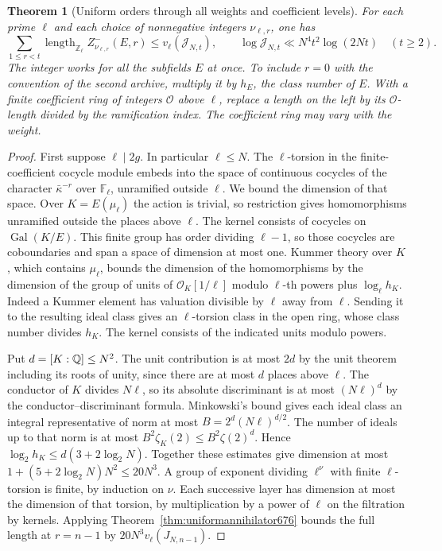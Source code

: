 \documentclass[a4paper,11pt]{article}
\newtheorem{theorem}[proposition]{Theorem}
\theoremstyle{definition}
\theoremstyle{remark}
\newcommand{\ZZ}{\mathbb Z}\newcommand{\ord}{\operatorname{ord}}
\newcommand{\len}{\operatorname{length}}\newcommand{\Res}{\operatorname*{Res}}
\numberwithin{equation}{section}
\begin{document}
\begin{theorem}[Uniform orders through all weights and coefficient levels]
\leavevmode\label{thm:oddinteger677}
For each prime \(\ell\) and each choice of nonnegative integers
\(\nu_{\ell,r}\), one has
\[
 \sum_{1\le r<t}\len_{\ZZ_\ell}Z^-_{\nu_{\ell,r}}(E,r)
                    \le v_\ell(\mathcal J_{N,t}),\qquad
 \log\mathcal J_{N,t}\ll N^4t^2\log(2Nt)\quad(t\ge2).
\]
The integer works for all the subfields \(E\) at once. To include
\(r=0\) with the convention of the second archive, multiply it
by \(h_E\), the class number of \(E\). With a finite coefficient
ring of integers \(\mathcal O\) above \(\ell\), replace a length on
the left by its \(\mathcal O\)-length divided by the ramification
index. The coefficient ring may vary with the weight.
\end{theorem}
\begin{proof}
First suppose \(\ell\mid 2g\). In particular \(\ell\le N\).
The \(\ell\)-torsion in the finite-coefficient cocycle module
embeds into the space of continuous cocycles of the character
\(\bar\kappa^{-r}\) over \(\mathbb F_\ell\), unramified outside
\(\ell\). We bound the dimension of that space. Over
\(K=E(\mu_\ell)\) the action is trivial, so restriction gives
homomorphisms unramified outside the places above \(\ell\).
The kernel consists of cocycles on \(\operatorname{Gal}(K/E)\).
This finite group has order dividing \(\ell-1\), so those
cocycles are coboundaries and span a space of dimension at most
one. Kummer theory over \(K\), which contains \(\mu_\ell\),
bounds the dimension of the homomorphisms by the dimension of
the group of units of \(\mathcal O_K[1/\ell]\) modulo
\(\ell\)-th powers plus \(\log_\ell h_K\). Indeed a Kummer
element has valuation divisible by \(\ell\) away from \(\ell\).
Sending it to the resulting ideal class gives an \(\ell\)-torsion
class in the open ring, whose class number divides \(h_K\).
The kernel consists of the indicated units modulo powers.

Put \(d=[K:\mathbb Q]\le N^2\). The unit contribution is at most
\(2d\) by the unit theorem including its roots of unity, since
there are at most \(d\) places above \(\ell\). The conductor
of \(K\) divides \(N\ell\), so its absolute discriminant is
at most \((N\ell)^d\) by the conductor--discriminant formula.
Minkowski's bound gives each ideal class an integral
representative of norm at most \(B=2^d(N\ell)^{d/2}\).
The number of ideals up to that norm is at most
\(B^2\zeta_K(2)\le B^2\zeta(2)^d\). Hence
\(\log_2 h_K\le d(3+2\log_2 N)\).
Together these estimates give dimension at most
\(1+(5+2\log_2 N)N^2\le20N^3\).
A group of exponent dividing \(\ell^\nu\) with finite
\(\ell\)-torsion is finite, by induction on \(\nu\). Each
successive layer has dimension at most the dimension of that
torsion, by multiplication by a power of \(\ell\) on the
filtration by kernels. Applying
Theorem~\ref{thm:uniformannihilator676} bounds the full length
at \(r=n-1\) by \(20N^3v_\ell(J_{N,n-1})\).


\end{proof}
\end{document}
